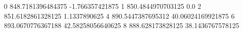 0 848.7181396484375 -1.766357421875
1 850.4844970703125 0.0
2 851.6182861328125 1.1337890625
4 890.5447387695312 40.06024169921875
6 893.0670776367188 42.58258056640625
8 888.628173828125 38.1436767578125
